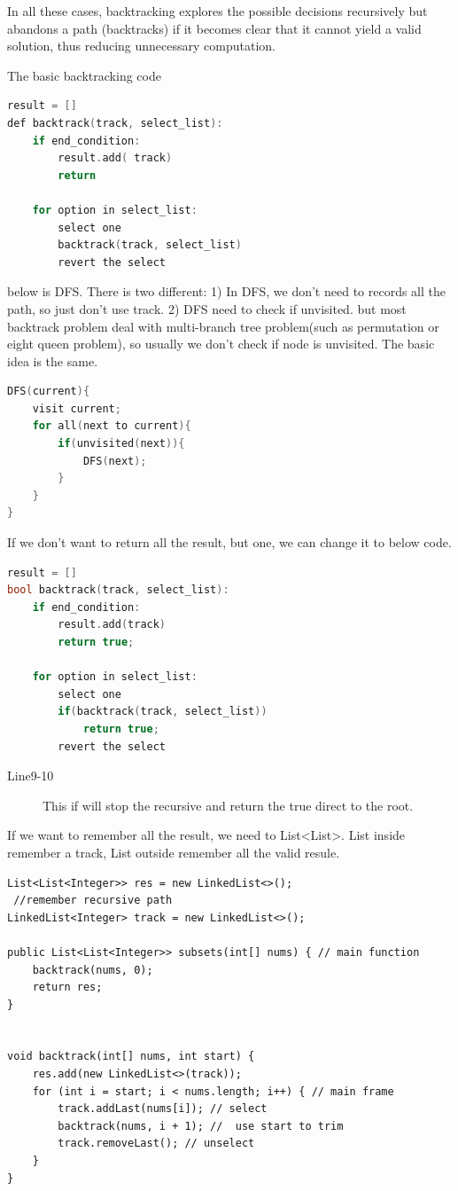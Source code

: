 \documentclass[a4paper,11pt,twoside]{book}
\begin{document}
\par In all these cases, backtracking explores the possible decisions recursively but abandons a path (backtracks) if it becomes clear that it cannot yield a valid solution, thus reducing unnecessary computation.

	
	\par The basic backtracking code
\begin{lstlisting}[frame=single, language=c++]
result = []
def backtrack(track, select_list):
	if end_condition:
		result.add( track)
		return

	for option in select_list:
		select one
		backtrack(track, select_list)
		revert the select	
\end{lstlisting}

	\par below is DFS. There is two different: 1) In DFS, we don't need to records all the path, so just don't use track. 2) DFS need to check if unvisited. but most backtrack problem deal with multi-branch tree problem(such as permutation or eight queen problem), so usually we don't check if node is unvisited. The basic idea is the same. 
\begin{lstlisting}[frame=single, language=c++]
DFS(current){
	visit current;
	for all(next to current){
		if(unvisited(next)){
			DFS(next);
		}
	}
}	
\end{lstlisting} 

	\par If we don't want to return all the result, but one, we can change it to below code. 
\begin{lstlisting}[frame=single, language=c++]
result = []
bool backtrack(track, select_list):
	if end_condition:
		result.add(track)
		return true;
	
	for option in select_list:
		select one
		if(backtrack(track, select_list))
			return true;
		revert the select	
\end{lstlisting}
\begin{description}
	\item[Line9-10] This if will stop the recursive and return the true direct to the root.
\end{description}

	\par If we want to remember all the result, we need to List<List>. List inside remember a track, List outside remember all the valid resule. 

\begin{lstlisting}
List<List<Integer>> res = new LinkedList<>();
 //remember recursive path
LinkedList<Integer> track = new LinkedList<>();

public List<List<Integer>> subsets(int[] nums) { // main function
	backtrack(nums, 0);
	return res;
}


void backtrack(int[] nums, int start) {
	res.add(new LinkedList<>(track));
	for (int i = start; i < nums.length; i++) { // main frame
		track.addLast(nums[i]); // select
		backtrack(nums, i + 1); //  use start to trim
		track.removeLast(); // unselect
	}
}


\end{lstlisting}
\end{document}
